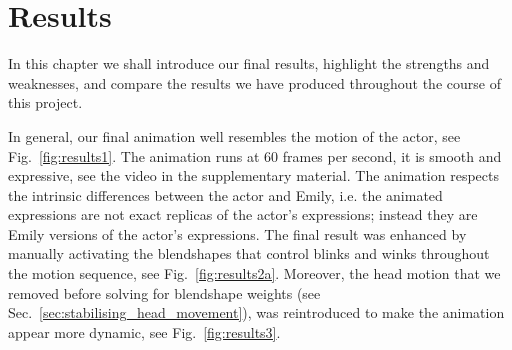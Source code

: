 \chapter{Results}
In this chapter we shall introduce our final results, highlight the strengths and weaknesses, and compare the results we have produced throughout the course of this project.

In general, our final animation well resembles the motion of the actor, see Fig.~\ref{fig:results1}. The animation runs at $60$ frames per second, it is smooth and expressive, see the video in the supplementary material. The animation respects the intrinsic differences between the actor and Emily, i.e. the animated expressions are not exact replicas of the actor's expressions; instead they are Emily versions of the actor's expressions. The final result was enhanced by manually activating the blendshapes that control blinks and winks throughout the motion sequence, see Fig.~\ref{fig:results2a}. Moreover, the head motion that we removed before solving for blendshape weights (see Sec.~\ref{sec:stabilising_head_movement}), was reintroduced to make the animation appear more dynamic, see Fig.~\ref{fig:results3}.

